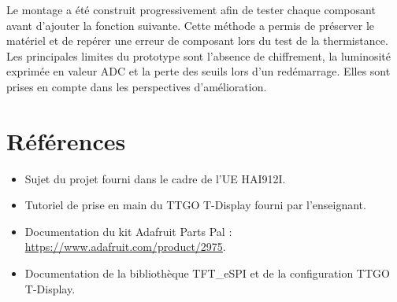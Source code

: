 \documentclass[12pt,a4paper]{report}
\begin{document}
Le montage a été construit progressivement afin de tester chaque composant
avant d'ajouter la fonction suivante. Cette méthode a permis de préserver le
matériel et de repérer une erreur de composant lors du test de la
thermistance. Les principales limites du prototype sont l'absence de
chiffrement, la luminosité exprimée en valeur ADC et la perte des seuils lors
d'un redémarrage. Elles sont prises en compte dans les perspectives
d'amélioration.

\section*{Références}

\begin{itemize}
  \item Sujet du projet fourni dans le cadre de l'UE HAI912I.
  \item Tutoriel de prise en main du TTGO T-Display fourni par l'enseignant.
  \item Documentation du kit Adafruit Parts Pal :
  \url{https://www.adafruit.com/product/2975}.
  \item Documentation de la bibliothèque TFT\_eSPI et de la configuration
  TTGO T-Display.
\end{itemize}
\end{document}
